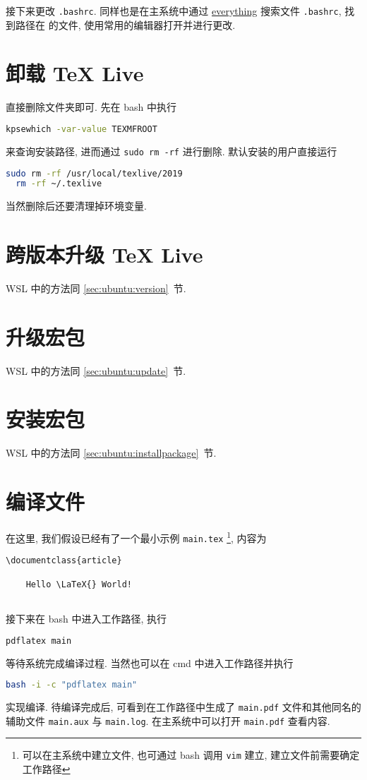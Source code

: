 接下来更改 \texttt{.bashrc}.
同样也是在主系统中通过
\href{https://www.voidtools.com/zh-cn/}{everything}
搜索文件 \texttt{.bashrc},
找到路径在  的文件,
使用常用的编辑器打开并进行更改.

\section{卸载 \TeX{} Live}

直接删除文件夹即可.
先在 \textsf{bash} 中执行
\begin{lstlisting}[language = bash]
  kpsewhich -var-value TEXMFROOT
\end{lstlisting}
来查询安装路径,
进而通过 \texttt{sudo rm -rf} 进行删除.
默认安装的用户直接运行
\begin{lstlisting}[language = bash]
  sudo rm -rf /usr/local/texlive/2019
  rm -rf ~/.texlive
\end{lstlisting}
当然删除后还要清理掉环境变量.

\section{跨版本升级 \TeX{} Live}

WSL 中的方法同 \ref{sec:ubuntu:version}~节.

\section{升级宏包}

WSL 中的方法同 \ref{sec:ubuntu:update}~节.

\section{安装宏包}

WSL 中的方法同 \ref{sec:ubuntu:installpackage}~节.

\section{编译文件}

在这里, 我们假设已经有了一个最小示例 \texttt{main.tex}%
\footnote{可以在主系统中建立文件,
也可通过 \textsf{bash} 调用 \texttt{vim} 建立,
建立文件前需要确定工作路径},
内容为
\begin{lstlisting}[language = {[LaTeX]TeX}]
  \documentclass{article}
  
    Hello \LaTeX{} World!
  
\end{lstlisting}
接下来在 \textsf{bash} 中进入工作路径,
执行
\begin{lstlisting}[language=bash]
  pdflatex main
\end{lstlisting}
等待系统完成编译过程. 
当然也可以在 \textsf{cmd} 中进入工作路径并执行
\begin{lstlisting}[language=bash]
  bash -i -c "pdflatex main"
\end{lstlisting}
实现编译.
待编译完成后, 可看到在工作路径中生成了 \texttt{main.pdf} 文件和其他同名的辅助文件 \texttt{main.aux} 与 \texttt{main.log}.
在主系统中可以打开 \texttt{main.pdf} 查看内容.


